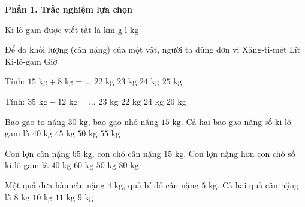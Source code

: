 \textbf{Phần 1. Trắc nghiệm lựa chọn}

\begin{ex} %
Ki-lô-gam được viết tắt là
\choice
{$\text{km}$}
{$\text{g}$}
{$\text{l}$}
{\True $\text{kg}$}
\end{ex}

\begin{ex} %
Để đo khối lượng (cân nặng) của một vật, người ta dùng đơn vị
\choice
{Xăng-ti-mét}
{Lít}
{\True Ki-lô-gam}
{Giờ}
\end{ex}

\begin{ex} %
Tính: $15\text{ kg} + 8\text{ kg} = \dots$
\choice
{$22\text{ kg}$}
{\True $23\text{ kg}$}
{$24\text{ kg}$}
{$25\text{ kg}$}
\end{ex}

\begin{ex} %
Tính: $35\text{ kg} - 12\text{ kg} = \dots$
\choice
{\True $23\text{ kg}$}
{$22\text{ kg}$}
{$24\text{ kg}$}
{$20\text{ kg}$}
\end{ex}

\begin{ex} %
Bao gạo to nặng $30\text{ kg}$, bao gạo nhỏ nặng $15\text{ kg}$. Cả hai bao gạo nặng số ki-lô-gam là
\choice
{$40\text{ kg}$}
{\True $45\text{ kg}$}
{$50\text{ kg}$}
{$55\text{ kg}$}
\end{ex}

\begin{ex} %
Con lợn cân nặng $65\text{ kg}$, con chó cân nặng $15\text{ kg}$. Con lợn nặng hơn con chó số ki-lô-gam là
\choice
{$40\text{ kg}$}
{$60\text{ kg}$}
{\True $50\text{ kg}$}
{$80\text{ kg}$}
\end{ex}

\begin{ex} %
Một quả dưa hấu cân nặng $4\text{ kg}$, quả bí đỏ cân nặng $5\text{ kg}$. Cả hai quả cân nặng là
\choice
{$8\text{ kg}$}
{$10\text{ kg}$}
{$11\text{ kg}$}
{\True $9\text{ kg}$}
\end{ex}

